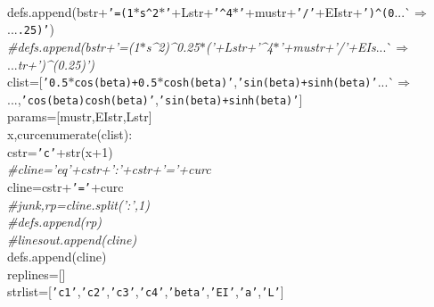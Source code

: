 {{\begin{tabbing}
\\
\hspace{20pt}defs.append(bstr+{\texttt{{'}=(\dash{}1$\ast$s\^{}2$\ast${'}}}+Lstr+{\texttt{{'}\^{}4$\ast${'}}}+mustr+{\texttt{{'}/{'}}}+EIstr+{\texttt{{'})\^{}(0}}{}...\`$\Rightarrow$\\
...{}{\texttt{.25){'}}})
\\
{\it{\#\hspace{20pt}defs.append(bstr+{'}=(\dash{}1$\ast$s\^{}2)\^{}0.25$\ast$({'}+Lstr+{'}\^{}4$\ast${'}+mustr+{'}/{'}+EIs}}{}...\`$\Rightarrow$\\
...{}{\it{tr+{'})\^{}(0.25){'})
}}\\
\hspace{20pt}clist={[}{\texttt{{'}0.5$\ast$cos(beta)+0.5$\ast$cosh(beta){'}}},{\texttt{{'}\dash{}sin(beta)+sinh(beta){'}}}{}...\`$\Rightarrow$\\
...{},{\texttt{{'}cos(beta)\dash{}cosh(beta){'}}},{\texttt{{'}sin(beta)+sinh(beta){'}}}{]}
\\
\hspace{20pt}params={[}mustr,EIstr,Lstr{]}
\\
\hspace{5pt}x,curc\hspace{5pt}enumerate(clist):
\\
\hspace{40pt}cstr={\texttt{{'}c{'}}}+str(x+1)
\\
{\it{\#\hspace{40pt}cline={'}eq{'}+cstr+{'}:{'}+cstr+{'}={'}+curc
}}\\
\hspace{40pt}cline=cstr+{\texttt{{'}={'}}}+curc
\\
{\it{\#\hspace{40pt}junk,rp=cline.split({'}:{'},1)
}}\\
{\it{\#\hspace{40pt}defs.append(rp)
}}\\
{\it{\#\hspace{40pt}linesout.append(cline)
}}\\
\hspace{40pt}defs.append(cline)
\\
\hspace{20pt}replines={[}{]}
\\
\hspace{20pt}strlist={[}{\texttt{{'}c1{'}}},{\texttt{{'}c2{'}}},{\texttt{{'}c3{'}}},{\texttt{{'}c4{'}}},{\texttt{{'}beta{'}}},{\texttt{{'}EI{'}}},{\texttt{{'}a{'}}},{\texttt{{'}L{'}}}{]}

\end{tabbing}}}
